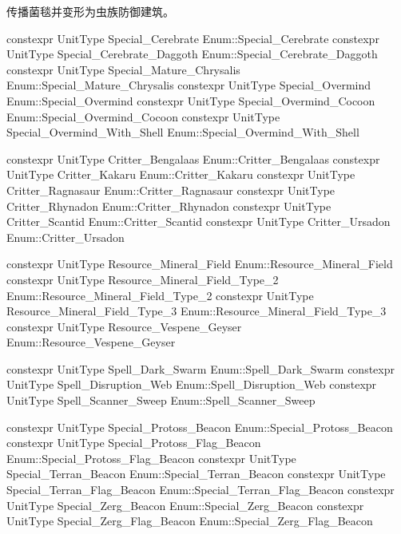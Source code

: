 \begin{note}
传播菌毯并变形为虫族防御建筑。
\end{note}
\begin{codebox}[变量(虫族特殊建筑)]
constexpr UnitType Special_Cerebrate {Enum::Special_Cerebrate}
constexpr UnitType Special_Cerebrate_Daggoth {Enum::Special_Cerebrate_Daggoth}
constexpr UnitType Special_Mature_Chrysalis {Enum::Special_Mature_Chrysalis}
constexpr UnitType Special_Overmind {Enum::Special_Overmind}
constexpr UnitType Special_Overmind_Cocoon {Enum::Special_Overmind_Cocoon}
constexpr UnitType Special_Overmind_With_Shell {Enum::Special_Overmind_With_Shell}
\end{codebox}
\begin{codebox}[变量(中立生物)]
constexpr UnitType Critter_Bengalaas {Enum::Critter_Bengalaas}
constexpr UnitType Critter_Kakaru {Enum::Critter_Kakaru}
constexpr UnitType Critter_Ragnasaur {Enum::Critter_Ragnasaur}
constexpr UnitType Critter_Rhynadon {Enum::Critter_Rhynadon}
constexpr UnitType Critter_Scantid {Enum::Critter_Scantid}
constexpr UnitType Critter_Ursadon {Enum::Critter_Ursadon}
\end{codebox}
\begin{codebox}[变量(资源)]
constexpr UnitType Resource_Mineral_Field {Enum::Resource_Mineral_Field}
constexpr UnitType Resource_Mineral_Field_Type_2 {Enum::Resource_Mineral_Field_Type_2}
constexpr UnitType Resource_Mineral_Field_Type_3 {Enum::Resource_Mineral_Field_Type_3}
constexpr UnitType Resource_Vespene_Geyser {Enum::Resource_Vespene_Geyser}
\end{codebox}
\begin{codebox}[变量(技能)]
constexpr UnitType Spell_Dark_Swarm {Enum::Spell_Dark_Swarm}
constexpr UnitType Spell_Disruption_Web {Enum::Spell_Disruption_Web}
constexpr UnitType Spell_Scanner_Sweep {Enum::Spell_Scanner_Sweep}
\end{codebox}
\begin{codebox}[变量(航标)]
constexpr UnitType Special_Protoss_Beacon {Enum::Special_Protoss_Beacon}
constexpr UnitType Special_Protoss_Flag_Beacon {Enum::Special_Protoss_Flag_Beacon}
constexpr UnitType Special_Terran_Beacon {Enum::Special_Terran_Beacon}
constexpr UnitType Special_Terran_Flag_Beacon {Enum::Special_Terran_Flag_Beacon}
constexpr UnitType Special_Zerg_Beacon {Enum::Special_Zerg_Beacon}
constexpr UnitType Special_Zerg_Flag_Beacon {Enum::Special_Zerg_Flag_Beacon}
\end{codebox}
